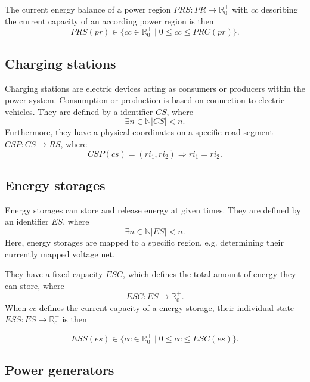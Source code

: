 The current energy balance of a power region
$PRS : PR \rightarrow \mathbb{R}_0^+$ with $cc$ describing the current capacity of an according power region is then
\[
PRS(pr) \in \{ cc \in \mathbb{R}_0^+ \mid 0 \leq cc \leq PRC(pr) \} \mathrm{.}
\]


\subsection{Charging stations}
\label{charging_stations}
Charging stations are electric devices acting as consumers or producers within the power system. Consumption or production is based on connection to electric vehicles.
They are defined by a identifier $CS$, where
\[
\exists n \in \mathbb{N} |CS| < n \mathrm{.}
\]
Furthermore, they have a physical coordinates on a specific road segment
$CSP : CS \rightarrow RS$, where
\[
CSP(cs) = (ri_1, ri_2) \Rightarrow ri_1 = ri_2 \mathrm{.}
\]

\subsection{Energy storages}
\label{energy_storages}
Energy storages can store and release energy at given times.
They are defined by an identifier $ES$, where 
\[
\exists n \in \mathbb{N} |ES| < n \mathrm{.}
\]
Here, energy storages are mapped to a specific region, e.g. determining their currently mapped voltage net.

They have a fixed capacity $ESC$, which defines the total amount of energy they can store, where
\[	
ESC : ES \rightarrow \mathbb{R}_0^+ \mathrm{.}
\]
When $cc$ defines the current capacity of a energy storage, their individual state $ESS : ES \rightarrow \mathbb{R}_0^+$ is then

\[
ESS(es) \in \{cc \in \mathbb{R}_0^+ \mid 0 \leq cc \leq ESC(es)\} \mathrm{.}
\]



\subsection{Power generators}
\label{power_generators}

